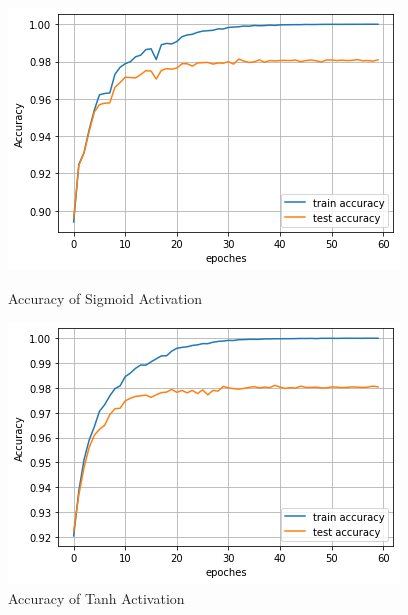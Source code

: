\documentclass[11pt]{homework}
\begin{document}
\begin{figure}[h!]
  \centering
  \begin{minipage}[h]{0.4\textwidth}
    \includegraphics[width=\textwidth]{acc-2-128-sigmoid.png}
     \caption{Accuracy of Sigmoid Activation}
     \label{exp-2-sigmoid}
  \end{minipage}
\hspace{1.5cm}
   \begin{minipage}[h]{0.4\textwidth}
    \includegraphics[width=\textwidth]{acc-2-128-tanh.png}
    \caption{Accuracy of Tanh Activation}
    \label{exp-2-tanh}
  \end{minipage}
\end{figure}
\end{document}
